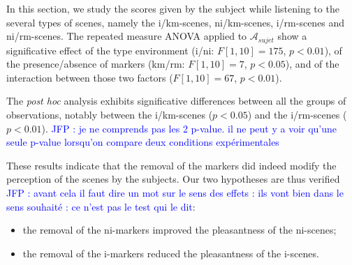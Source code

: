 \documentclass[preprint,12pt]{elsarticle}
\newcommand{\jfp}[1]{\textcolor{blue}{JFP : #1}}
\begin{document}
In this section, we study the scores given by the subject while listening to the several types of scenes, namely the i/km-scenes, ni/km-scenes, i/rm-scenes and ni/rm-scenes. The repeated measure ANOVA applied to $\mathcal{A}_{sujet}$ show a significative effect of the type environment (i/ni: $F[1,10]=175$, $p<0.01$), of the presence/absence of markers (km/rm: $F[1,10]=7$, $p<0.05$), and of the interaction between those two factors ($F[1,10]=67$, $p<0.01$).


The \emph{post hoc} analysis exhibits significative differences between all the groups of observations, notably between the i/km-scenes ($p<0.05$) and the i/rm-scenes ($p<0.01$). \jfp{je ne comprends pas les 2 p-value. il ne peut y a voir qu'une seule p-value lorsqu'on compare deux conditions expérimentales
}


These results indicate that the removal of the markers did indeed modify the perception of the scenes by the subjects. Our two hypotheses are thus verified \jfp{avant cela il faut dire un mot sur le sens des effets : ils vont bien dans le sens souhaité : ce n'est pas le test qui le dit}:


\begin{itemize}
\item the removal of the ni-markers improved the pleasantness of the ni-scenes;
\item the removal of the i-markers reduced the pleasantness of the i-scenes.
\end{itemize}

\end{document}
